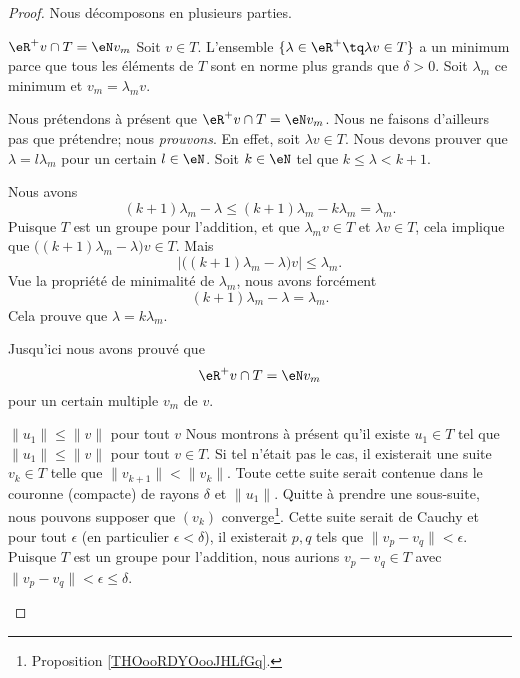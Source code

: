\begin{proof}
	Nous décomposons en plusieurs parties.

	\begin{subproof}
		\item[\( \eR^+v\cap T=\eN v_m\)]
		Soit \( v\in T\). L'ensemble \( \{ \lambda \in \eR^+\tq \lambda v\in T\}\) a un minimum parce que tous les éléments de \( T\) sont en norme plus grands que \( \delta>0\). Soit \( \lambda_m\) ce minimum et \( v_m=\lambda_mv\).

		Nous prétendons à présent que \( \eR^+v\cap T=\eN v_m\). Nous ne faisons d'ailleurs pas que prétendre; nous \emph{prouvons}. En effet, soit \( \lambda v\in T\). Nous devons prouver que \( \lambda = l\lambda_m\) pour un certain \( l\in \eN\). Soit \( k\in \eN\) tel que \( k\leq \lambda<k+1\).

		Nous avons
		\begin{equation}
			(k+1)\lambda_m-\lambda\leq (k+1)\lambda_m-k\lambda_m=\lambda_m.
		\end{equation}
		Puisque \( T\) est un groupe pour l'addition, et que \( \lambda_mv\in T\) et \( \lambda v\in T\), cela implique que \( \big( (k+1)\lambda_m-\lambda \big)v\in T\). Mais
		\begin{equation}
			| \big( (k+1)\lambda_m-\lambda \big)v |\leq \lambda_m.
		\end{equation}
		Vue la propriété de minimalité de \( \lambda_m\), nous avons forcément
		\begin{equation}
			(k+1)\lambda_m-\lambda = \lambda_m.
		\end{equation}
		Cela prouve que \( \lambda=k\lambda_m\).

		Jusqu'ici nous avons prouvé que
		\begin{equation}
			\eR^+v\cap T=\eN v_m
		\end{equation}
		pour un certain multiple \( v_m\) de \( v\).

		\item[\( \| u_1 \|\leq \| v \|\) pour tout \( v\)]
		Nous montrons à présent qu'il existe \( u_1\in T\) tel que \( \| u_1 \|\leq \| v \|\) pour tout \( v\in T\). Si tel n'était pas le cas, il existerait une suite \( v_k\in T\) telle que \( \| v_{k+1} \|<\| v_k \|\). Toute cette suite serait contenue dans le couronne (compacte) de rayons \( \delta\) et \( \| u_1 \|\). Quitte à prendre une sous-suite, nous pouvons supposer que \( (v_k)\) converge\footnote{Proposition \ref{THOooRDYOooJHLfGq}.}. Cette suite serait de Cauchy et pour tout \( \epsilon\) (en particulier \( \epsilon<\delta\)), il existerait \( p,q\) tels que \( \| v_p-v_q \|<\epsilon\). Puisque \( T\) est un groupe pour l'addition, nous aurions \( v_p-v_q\in T\) avec \( \| v_p-v_q \|<\epsilon\leq \delta\).


\end{subproof}
\end{proof}
